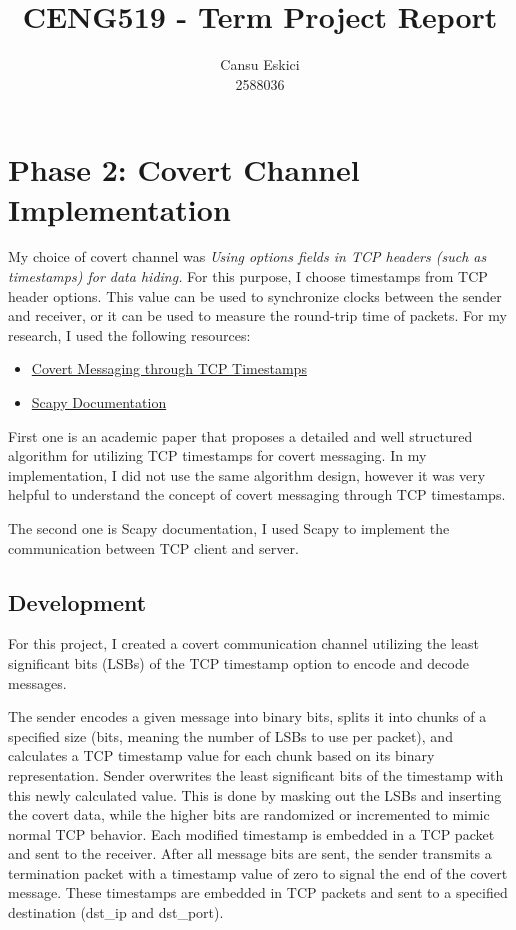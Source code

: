 \documentclass[10pt,a4paper]{article}
\title{CENG519 - Term Project Report}
\author{
  Cansu Eskici\\
  2588036}
\begin{document}
\maketitle
\section*{Phase 2: Covert Channel Implementation}
My choice of covert channel was \textit{Using options fields in TCP headers (such as timestamps) for data hiding.} 
For this purpose, I choose timestamps from TCP header options. 
This value can be used to synchronize clocks between the sender and receiver, or it can be used to measure the round-trip time of packets.
For my research, I used the following resources:
\begin{itemize}
    \item \href{https://web.mit.edu/greenie/Public/petspaper.pdf}{Covert Messaging through TCP Timestamps}
    \item \href{https://scapy.readthedocs.io/en/latest/}{Scapy Documentation}
\end{itemize}

First one is an academic paper that proposes a detailed and well structured algorithm for utilizing TCP timestamps for covert messaging. In my implementation, I did not use the same algorithm design, however it was very helpful to understand the concept of covert messaging through TCP timestamps.

The second one is Scapy documentation, I used Scapy to implement the communication between TCP client and server. 

\subsection*{Development}

For this project, I created a covert communication channel utilizing the least significant bits (LSBs) of the TCP timestamp option to encode and decode messages.


The sender encodes a given message into binary bits, splits it into chunks of a specified size (bits, meaning the number of LSBs to use per packet), and calculates a TCP timestamp value for each chunk based on its binary representation. 
Sender overwrites the least significant bits of the timestamp with this newly calculated value. 
This is done by masking out the LSBs and inserting the covert data, while the higher bits are randomized or incremented to mimic normal TCP behavior. 
Each modified timestamp is embedded in a TCP packet and sent to the receiver.
After all message bits are sent, the sender transmits a termination packet with a timestamp value of zero to signal the end of the covert message.
These timestamps are embedded in TCP packets and sent to a specified destination (dst\_ip and dst\_port). 
\end{document}
